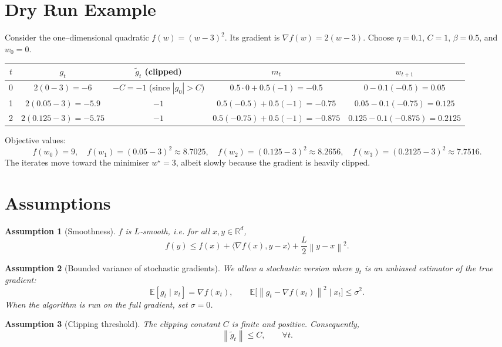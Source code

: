 \documentclass{article}
\newtheorem{assumption}{Assumption}
\newcommand{\EE}{\mathbb{E}}
\newcommand{\norm}[1]{\left\lVert#1\right\rVert}
\newcommand{\grad}{\nabla}
\begin{document}
\section*{Dry Run Example}
Consider the one–dimensional quadratic $f(w)=(w-3)^2$.  
Its gradient is $\grad f(w)=2(w-3)$. Choose $\eta=0.1$, $C=1$, $\beta=0.5$, and $w_0=0$.  

\begin{center}
\begin{tabular}{c|c|c|c|c}
$t$ & $g_t$ & $\tilde g_t$ (clipped) & $m_t$ & $w_{t+1}$ \\ \hline
0 & $2(0-3)=-6$ & $-C = -1$ (since $|g_0|>C$) & $0.5\cdot0+0.5(-1)=-0.5$ & $0-0.1(-0.5)=0.05$ \\[4pt]
1 & $2(0.05-3)=-5.9$ & $-1$ & $0.5(-0.5)+0.5(-1)=-0.75$ & $0.05-0.1(-0.75)=0.125$ \\[4pt]
2 & $2(0.125-3)=-5.75$ & $-1$ & $0.5(-0.75)+0.5(-1)=-0.875$ & $0.125-0.1(-0.875)=0.2125$
\end{tabular}
\end{center}

Objective values:
\[
f(w_0)=9,\quad f(w_1)=(0.05-3)^2\approx 8.7025,\quad 
f(w_2)=(0.125-3)^2\approx 8.2656,\quad 
f(w_3)=(0.2125-3)^2\approx 7.7516.
\]
The iterates move toward the minimiser $w^\star=3$, albeit slowly because the
gradient is heavily clipped.

\newpage
\section*{Assumptions}
\begin{assumption}[Smoothness]\label{ass:smooth}
$f$ is $L$‑smooth, i.e. for all $x,y\in\mathbb{R}^d$,
\[
f(y)\le f(x)+\langle\grad f(x),y-x\rangle+\frac{L}{2}\norm{y-x}^2 .
\]
\end{assumption}

\begin{assumption}[Bounded variance of stochastic gradients]\label{ass:variance}
We allow a stochastic version where $g_t$ is an unbiased estimator of the true gradient:
\[
\EE[g_t\mid x_t]=\grad f(x_t),\qquad 
\EE\bigl[\norm{g_t-\grad f(x_t)}^2\mid x_t\bigr]\le\sigma^2 .
\]
When the algorithm is run on the full gradient, set $\sigma=0$.
\end{assumption}

\begin{assumption}[Clipping threshold]\label{ass:clip}
The clipping constant $C$ is finite and positive. Consequently,
\[
\norm{\tilde g_t}\le C,\qquad\forall t .
\]
\end{assumption}
\end{document}
